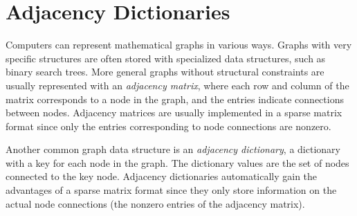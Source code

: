 
\section*{Adjacency Dictionaries} %

Computers can represent mathematical graphs in various ways.
Graphs with very specific structures are often stored with specialized data structures, such as binary search trees.
More general graphs without structural constraints are usually represented with an \emph{adjacency matrix}, where each row and column of the matrix corresponds to a node in the graph, and the entries indicate connections between nodes.
Adjacency matrices are usually implemented in a sparse matrix format since only the entries corresponding to node connections are nonzero.

Another common graph data structure is an \emph{adjacency dictionary}, a dictionary with a key for each node in the graph.
The dictionary values are the set of nodes connected to the key node.
Adjacency dictionaries automatically gain the advantages of a sparse matrix format since they only store information on the actual node connections (the nonzero entries of the adjacency matrix).

